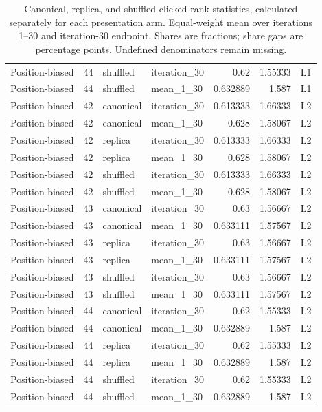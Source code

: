 \begin{table}[htbp!]
\begin{tabular}{lrllrrl}
Position-biased & 44 & shuffled & iteration\_30 & 0.62 & 1.55333 & L1 \\
Position-biased & 44 & shuffled & mean\_1\_30 & 0.632889 & 1.587 & L1 \\
Position-biased & 42 & canonical & iteration\_30 & 0.613333 & 1.66333 & L2 \\
Position-biased & 42 & canonical & mean\_1\_30 & 0.628 & 1.58067 & L2 \\
Position-biased & 42 & replica & iteration\_30 & 0.613333 & 1.66333 & L2 \\
Position-biased & 42 & replica & mean\_1\_30 & 0.628 & 1.58067 & L2 \\
Position-biased & 42 & shuffled & iteration\_30 & 0.613333 & 1.66333 & L2 \\
Position-biased & 42 & shuffled & mean\_1\_30 & 0.628 & 1.58067 & L2 \\
Position-biased & 43 & canonical & iteration\_30 & 0.63 & 1.56667 & L2 \\
Position-biased & 43 & canonical & mean\_1\_30 & 0.633111 & 1.57567 & L2 \\
Position-biased & 43 & replica & iteration\_30 & 0.63 & 1.56667 & L2 \\
Position-biased & 43 & replica & mean\_1\_30 & 0.633111 & 1.57567 & L2 \\
Position-biased & 43 & shuffled & iteration\_30 & 0.63 & 1.56667 & L2 \\
Position-biased & 43 & shuffled & mean\_1\_30 & 0.633111 & 1.57567 & L2 \\
Position-biased & 44 & canonical & iteration\_30 & 0.62 & 1.55333 & L2 \\
Position-biased & 44 & canonical & mean\_1\_30 & 0.632889 & 1.587 & L2 \\
Position-biased & 44 & replica & iteration\_30 & 0.62 & 1.55333 & L2 \\
Position-biased & 44 & replica & mean\_1\_30 & 0.632889 & 1.587 & L2 \\
Position-biased & 44 & shuffled & iteration\_30 & 0.62 & 1.55333 & L2 \\
Position-biased & 44 & shuffled & mean\_1\_30 & 0.632889 & 1.587 & L2 \\
\hline
\end{tabular}
\caption{Canonical, replica, and shuffled clicked-rank statistics, calculated separately for each presentation arm. Equal-weight mean over iterations 1--30 and iteration-30 endpoint. Shares are fractions; share gaps are percentage points. Undefined denominators remain missing.}
\label{chap:results:tab:rq2_models_rank_statistics}
\end{table}
